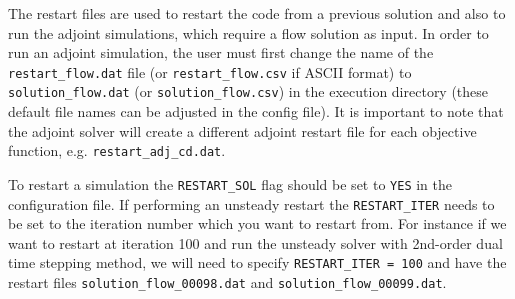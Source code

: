 \documentclass[12pt, a4paper, twoside]{article}
\begin{document}
The restart files are used to restart the code from a previous solution and also to run the adjoint simulations, which require a flow solution as input. In order to run an adjoint simulation, the user must first change the name of the \verb|restart_flow.dat| file (or \verb|restart_flow.csv| if ASCII format) to \texttt{solution\_flow.dat} (or \verb|solution_flow.csv|) in the execution directory (these default file names can be adjusted in the config file). It is important to note that the adjoint solver will create a different adjoint restart file for each objective function, e.g. \verb|restart_adj_cd.dat|.

To restart a simulation the \verb|RESTART_SOL| flag should be set to \verb|YES| in the configuration file. If performing an unsteady restart the \verb|RESTART_ITER| needs to be set to the iteration number which you want to restart from. For instance if we want to restart at iteration 100 and run the unsteady solver with 2nd-order dual time stepping method, we will need to specify \verb|RESTART_ITER = 100| and have the restart files \verb|solution_flow_00098.dat| and \verb|solution_flow_00099.dat|.


\newpage
\end{document}
